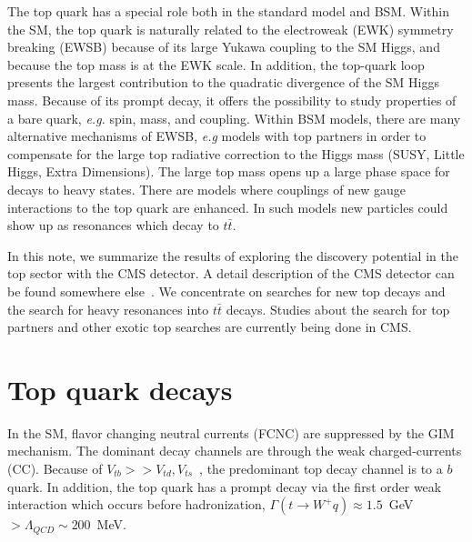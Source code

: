 \documentclass{cimento}
\begin{document}
The top quark has a special role both in the standard model and BSM. Within
the SM, the top quark is naturally related to the electroweak (EWK)
symmetry breaking (EWSB) because of its large Yukawa coupling to the SM Higgs,
and because the top mass is at the EWK scale. In addition, the top-quark loop
presents the largest contribution to the quadratic divergence of
the SM Higgs mass. Because of its prompt decay, it offers the possibility to study 
properties of a bare quark, {\it e.g.} spin, mass, and coupling. Within 
BSM models, there are many alternative mechanisms of EWSB, {\it e.g} models with top partners
in order to compensate for the large top radiative correction to the Higgs 
mass (SUSY, Little Higgs, Extra Dimensions). The large top mass opens up
a large phase space for decays to heavy states. There are models where couplings
of new gauge interactions to the top quark are enhanced. In such models new particles 
could show up as resonances which decay to $t\bar{t}$. 

In this note, we summarize the results of exploring the discovery
potential in the top sector with the CMS detector. A detail description
of the CMS detector can be found somewhere else~\cite{ref:CMS}. We concentrate
on searches for new top decays and the search for heavy resonances into
$t\bar{t}$ decays. Studies about the search for top partners and other exotic
top searches are currently being done in CMS.

\section{Top quark decays}
\label{sec:Decays}

In the SM, flavor changing neutral currents (FCNC) are suppressed by
the GIM mechanism. The dominant decay channels are through the
weak charged-currents (CC). Because of $V_{tb}>>V_{td},V_{ts}$~\cite{ref:pdg}, the 
predominant top decay channel is to a $b$ quark. In addition, the top
quark has a prompt decay via the first order weak interaction which
occurs before
hadronization,  $\Gamma(t\rightarrow W^+ q) \approx 1.5$~GeV $> \Lambda_{QCD}
 \sim 200$~MeV.
 
\end{document}
